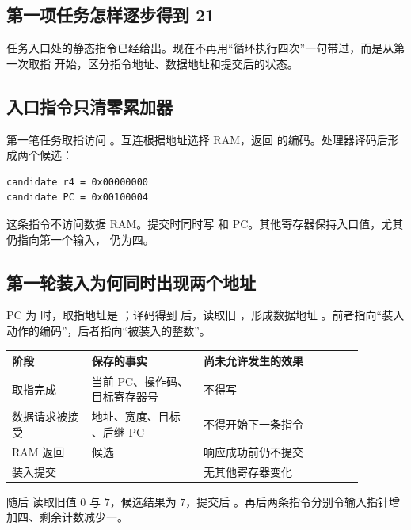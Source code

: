 \subsection{第一项任务怎样逐步得到 21}

任务入口处的静态指令已经给出。现在不再用“循环执行四次”一句带过，而是从第一次取指
开始，区分指令地址、数据地址和提交后的状态。

\subsection{入口指令只清零累加器}

第一笔任务取指访问 。互连根据地址选择 RAM，返回
 的编码。处理器译码后形成两个候选：

\begin{lstlisting}
candidate r4 = 0x00000000
candidate PC = 0x00100004
\end{lstlisting}

这条指令不访问数据 RAM。提交时同时写  和 PC。其他寄存器保持入口值，尤其
 仍指向第一个输入， 仍为四。

\subsection{第一轮装入为何同时出现两个地址}

PC 为  时，取指地址是 ；译码得到
 后，读取旧 ，形成数据地址
。前者指向“装入动作的编码”，后者指向“被装入的整数”。

\begin{longtable}{|L{0.20\linewidth}|L{0.28\linewidth}|L{0.40\linewidth}|}
\hline
{}
阶段 & 保存的事实 & 尚未允许发生的效果 \\ \hline
取指完成 & 当前 PC、操作码、目标寄存器号 & 不得写  \\ \hline
数据请求被接受 & 地址、宽度、目标 、后继 PC & 不得开始下一条指令 \\ \hline
RAM 返回  & 候选  & 响应成功前仍不提交 \\ \hline
装入提交 &  & 无其他寄存器变化 \\ \hline
\end{longtable}

随后  读取旧值 \(0\) 与 \(7\)，候选结果为 \(7\)，提交后
。再后两条指令分别令输入指针增加四、剩余计数减少一。

